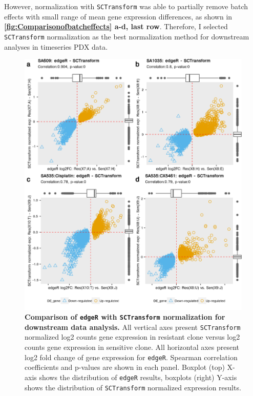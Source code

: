 However, normalization with \texttt{SCTransform} was able to partially remove batch effects with small range of mean gene expression differences, as shown in  \textbf{\autoref{fig:Comparisonofbatcheffects} a-d, last row}.
Therefore, I selected \texttt{SCTransform} normalization as the best normalization method for downstream analyses in timeseries PDX data. 
 
 
 

\begin{figure}
\centering
\includegraphics[width=\textwidth]{Figures/chap5/edgeRSCTransformcorrelation.png}
	
\caption[Evaluation of \texttt{edgeR} in all PDX timeseries data.]
	{\small
	\textbf{Comparison of \texttt{edgeR} with \texttt{SCTransform} normalization for downstream data analysis.}
All vertical axes present \texttt{SCTransform} normalized log2 counts gene expression in resistant clone versus log2 counts gene expression in sensitive clone. All horizontal axes present log2 fold change of gene expression for \texttt{edgeR}.	Spearman correlation coefficients and p-values are shown in each panel. Boxplot (top) X-axis shows the distribution of \texttt{edgeR} results, boxplots (right) Y-axis shows the distribution of \texttt{SCTransform} normalized expression results.
	}
	\label{fig:edgeRsctransformcorrelation}
\end{figure}

